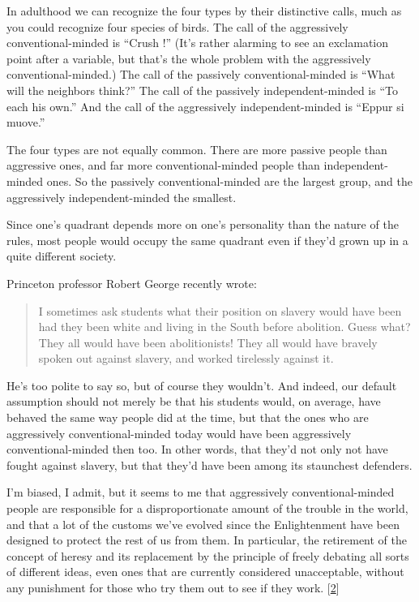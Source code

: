 In adulthood we can recognize the four types by their distinctive calls,
much as you could recognize four species of birds. The call of the
aggressively conventional-minded is ``Crush !'' (It's rather alarming to
see an exclamation point after a variable, but that's the whole problem
with the aggressively conventional-minded.) The call of the passively
conventional-minded is ``What will the neighbors think?'' The call of
the passively independent-minded is ``To each his own.'' And the call of
the aggressively independent-minded is ``Eppur si muove.''

The four types are not equally common. There are more passive people
than aggressive ones, and far more conventional-minded people than
independent-minded ones. So the passively conventional-minded are the
largest group, and the aggressively independent-minded the smallest.

Since one's quadrant depends more on one's personality than the nature
of the rules, most people would occupy the same quadrant even if they'd
grown up in a quite different society.

Princeton professor Robert George recently wrote:

\begin{quote}
I sometimes ask students what their position on slavery would have been
had they been white and living in the South before abolition. Guess
what? They all would have been abolitionists! They all would have
bravely spoken out against slavery, and worked tirelessly against it.
\end{quote}

He's too polite to say so, but of course they wouldn't. And indeed, our
default assumption should not merely be that his students would, on
average, have behaved the same way people did at the time, but that the
ones who are aggressively conventional-minded today would have been
aggressively conventional-minded then too. In other words, that they'd
not only not have fought against slavery, but that they'd have been
among its staunchest defenders.

I'm biased, I admit, but it seems to me that aggressively
conventional-minded people are responsible for a disproportionate amount
of the trouble in the world, and that a lot of the customs we've evolved
since the Enlightenment have been designed to protect the rest of us
from them. In particular, the retirement of the concept of heresy and
its replacement by the principle of freely debating all sorts of
different ideas, even ones that are currently considered unacceptable,
without any punishment for those who try them out to see if they work.
{[}\hyperref[f2n]{2}{]}

